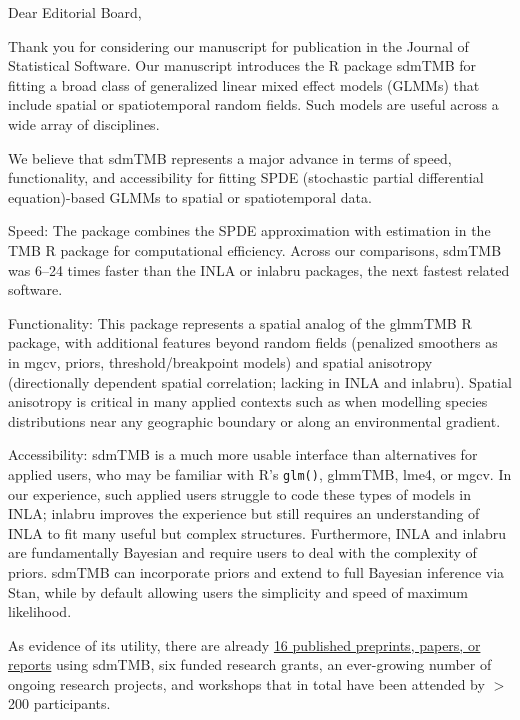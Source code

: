 \documentclass[letterpaper]{letter}
\providecommand{\pkg}[1]{{\normalfont\fontseries{b}\selectfont #1}}
\let\proglang=\textsf
\begin{document}
\begin{letter}{}
\pagestyle{empty}

\opening{Dear Editorial Board,}

Thank you for considering our manuscript for publication in the Journal of Statistical Software. Our manuscript introduces the \proglang{R} package \pkg{sdmTMB} for fitting a broad class of generalized linear mixed effect models (GLMMs) that include spatial or spatiotemporal random fields. Such models are useful across a wide array of disciplines.

We believe that \pkg{sdmTMB} represents a major advance in terms of speed, functionality, and accessibility for fitting SPDE (stochastic partial differential equation)-based GLMMs to spatial or spatiotemporal data.

Speed: The package combines the SPDE approximation with estimation in the \pkg{TMB} \proglang{R} package for computational efficiency. Across our comparisons, \pkg{sdmTMB} was 6--24 times faster than the \pkg{INLA} or \pkg{inlabru} packages, the next fastest related software.

Functionality: This package represents a spatial analog of the \pkg{glmmTMB} \proglang{R} package, with additional features beyond random fields (penalized smoothers as in \pkg{mgcv}, priors, threshold/breakpoint models) and spatial anisotropy (directionally dependent spatial correlation; lacking in \pkg{INLA} and \pkg{inlabru}). Spatial anisotropy is critical in many applied contexts such as when modelling species distributions near any geographic boundary or along an environmental gradient.

Accessibility: \pkg{sdmTMB} is a much more usable interface than alternatives for applied users, who may be familiar with \proglang{R}'s \texttt{glm()}, \pkg{glmmTMB}, \pkg{lme4}, or \pkg{mgcv}. In our experience, such applied users struggle to code these types of models in \pkg{INLA}; \pkg{inlabru} improves the experience but still requires an understanding of \pkg{INLA} to fit many useful but complex structures. Furthermore, \pkg{INLA} and \pkg{inlabru} are fundamentally Bayesian and require users to deal with the complexity of priors. \pkg{sdmTMB} can incorporate priors and extend to full Bayesian inference via \pkg{Stan}, while by default allowing users the simplicity and speed of maximum likelihood.

As evidence of its utility, there are already \href{https://github.com/pbs-assess/sdmTMB/wiki/Publications-using-sdmTMB}{16 published preprints, papers, or reports} using \pkg{sdmTMB}, six funded research grants, an ever-growing number of ongoing research projects, and workshops that in total have been attended by $>$200 participants.


\end{letter}
\end{document}
